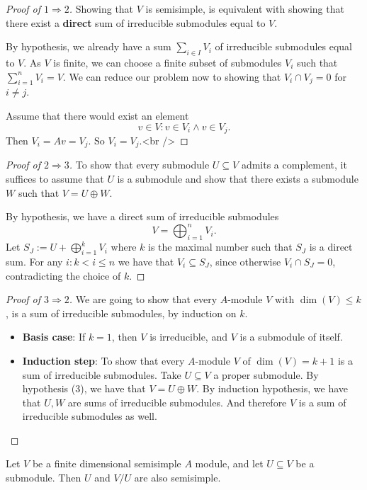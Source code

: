 \begin{proof}
[Proof of \(1\Rightarrow 2\)] Showing that \(V\) is semisimple, is equivalent with showing that there exist a \textbf{direct} sum of irreducible submodules equal to \(V\).

By hypothesis, we already have a sum \(\sum _{i\in I}V_{i}\) of irreducible submodules equal to \(V\). As \(V\) is finite, we can choose a finite subset of submodules \(V_{i}\) such that \(\sum _{i=1}^nV_{i}=V\). We can reduce our problem now to showing that \(V_{i}\cap V_{j}=0\) for \(i\neq j\).

Assume that there would exist an element
\[
v\in V: v\in V_{i}\wedge v\in V_{j}.
\]
Then \(V_{i}=Av=V_{j}\). So \(V_{i}=V_{j}\).<br />
\end{proof}

\begin{proof}
[Proof of \(2 \Rightarrow 3\)] To show that every submodule \(U\subseteq V\) admits a complement, it suffices to assume that \(U\) is a submodule and show that there exists a submodule \(W\) such that \(V=U\oplus W\).

By hypothesis, we have a direct sum of irreducible submodules
\[
V=\bigoplus_{i=1}^nV_{i}.
\]
Let \(S_J:=U+\bigoplus_{i=1}^kV_{i}\) where $k$ is the maximal number such that $S_J$ is a direct sum. For any \(i : k<i\leq n\) we have that \(V_{i}\subseteq S_J\), since otherwise \(V_{i}\cap S_J=0\), contradicting the choice of $k$.
\end{proof}

\begin{proof}[Proof of \(3\Rightarrow 2\)] 
We are going to show that every \(A\)-module \(V\) with \(\dim(V)\leq k\), is a sum of irreducible submodules, by induction on \(k\).

\begin{itemize}
  \item \textbf{Basis case}: If \(k=1\), then \(V\) is irreducible, and \(V\) is a submodule of itself.
  \item \textbf{Induction step}: To show that every \(A\)-module \(V\) of $\dim(V)=k+1$ is a sum of irreducible submodules.
Take \(U\subseteq V\) a proper submodule. By hypothesis (3), we have that \(V=U\oplus W\). By induction hypothesis, we have that \(U,W\) are sums of irreducible submodules. And therefore \(V\) is a sum of irreducible submodules as well.
\end{itemize}
\end{proof}

\begin{prop}
Let \(V\) be a finite dimensional semisimple \(A\) module, and let \(U\subseteq V\) be a submodule. Then \(U\) and \(V/U\) are also semisimple.
\end{prop}

